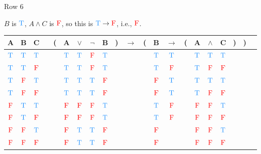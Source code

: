 \documentclass[
  ignorenonframetext,
]{beamer}
\renewcommand{\,}{\text{, }}
\def\True{\textcolor{dodgerblue}{\text{T}}}
\def\False{\textcolor{red}{\text{F}}}
\begin{document}
\begin{frame}{Row 6}
\protect\hypertarget{row-6}{}

\(B\) is \(\True\), \(A \wedge C\) is \(\False\), so this is
\(\True \rightarrow \False\), i.e., \(\False\).

\begin{center}
\bigskip
\begin{tabular}{@{ }c@{ }@{ }c@{ }@{ }c | c@{ }@{}c@{}@{ }c@{ }@{ }c@{ }@{ }c@{ }@{ }c@{ }@{}c@{}@{ }c@{ }@{}c@{}@{ }c@{ }@{ }c@{ }@{}c@{}@{ }c@{ }@{ }c@{ }@{ }c@{ }@{}c@{}@{}c@{}@{ }c}
A & B & C &  & ( & A & $\vee$ & $\neg$ & B & ) & $\rightarrow$ & ( & B & $\rightarrow$ & ( & A & $\wedge$ & C & ) & ) & \\
\hline 
 $\True$ & $\True$ & $\True$ &  &  & $\True$ & $\True$ & $\False$ & $\True$ &  &&  & $\True$ & $\True$ &  & $\True$ & $\True$ & $\True$ &  &  & \\
 $\True$ & $\True$ & $\False$ &  &  & $\True$ & $\True$ & $\False$ & $\True$ &  &&  & $\True$ & $\False$ &  & $\True$ & $\False$ & $\False$ &  &  & \\
 $\True$ & $\False$ & $\True$ &  &  & $\True$ & $\True$ & $\True$ & $\False$ &  &&  & $\False$ & $\True$ &  & $\True$ & $\True$ & $\True$ &  &  & \\
 $\True$ & $\False$ & $\False$ &  &  & $\True$ & $\True$ & $\True$ & $\False$ &  &&  & $\False$ & $\True$ &  & $\True$ & $\False$ & $\False$ &  &  & \\
 $\False$ & $\True$ & $\True$ &  &  & $\False$ & $\False$ & $\False$ & $\True$ &  &&  & $\True$ & $\False$ &  & $\False$ & $\False$ & $\True$ &  &  & \\
 $\False$ & $\True$ & $\False$ &  &  & $\False$ & $\False$ & $\False$ & $\True$ &  &&  & $\True$ & $\False$ &  & $\False$ & $\False$ & $\False$ &  &  & \\
 $\False$ & $\False$ & $\True$ &  &  & $\False$ & $\True$ & $\True$ & $\False$ &  &&  & $\False$ &&  & $\False$ & $\False$ & $\True$ &  &  & \\
 $\False$ & $\False$ & $\False$ &  &  & $\False$ & $\True$ & $\True$ & $\False$ &  &&  & $\False$ &&  & $\False$ & $\False$ & $\False$ &  &  & \\
\end{tabular}
\bigskip
\end{center}

\end{frame}
\end{document}
